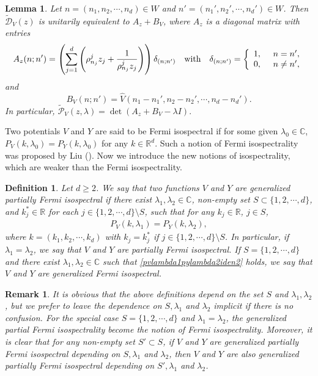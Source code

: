 \documentclass[12pt,letterpaper]{amsart}
\newtheorem{lemma}{Lemma}[section]
\newtheorem{remark}{Remark}[section]
\newtheorem{definition}{Definition}[section]
\def\R{{\mathbb R}}
\def\C{{\mathbb C}}
\begin{document}
\begin{lemma} \label{lemunitary}Let $n=(n_1,n_2,\cdots,n_d)\in W$ and $n'=(n_1',n_2',\cdots,n_d')\in W$. Then $\tilde{\mathcal{D}}_V(z)$ is unitarily equivalent to $A_z+B_V$, where $A_z$ is a diagonal matrix with entries
\[A_z(n;n')=\left(\sum_{j=1}^d\left(\rho^j_{n_j}z_j+\frac{1}{\rho^j_{n_j}z_j}\right)\right)\delta_{(n;n')}\quad {\rm with}\quad \delta_{(n;n')}=\left\{\begin{array}{l}
	1, \quad\  n=n',\\
	0,~\quad n\neq n',
\end{array}\right.\]
and
\[B_V(n;n')=\hat{V}(n_1-n_1',n_2-n_2',\cdots,n_d-n_d').\]
In particular, $\tilde{\mathcal{P}}_V(z,\lambda)=\det(A_z+B_V-\lambda I).$
\end{lemma}
{Two potentials $V$ and $Y$ are said to be Fermi isospectral if for some given $\lambda_0\in\C$, $P_V(k,\lambda_0)=P_Y(k,\lambda_0)$ for any $k\in\R^d$. Such a notion of Fermi isospectrality was proposed by Liu (\cite[Remark 2.6]{liucpam}). {Now we introduce the new notions of isospectrality, which are weaker than the Fermi isospectrality.}
\begin{definition}\label{defferisotrans}
Let $d\geq 2$. We say that two functions $V$ and $Y$ are generalized partially Fermi isospectral if there exist $\lambda_1,\lambda_2\in\C$, non-empty set $S\subset\{1,2,\cdots,d\}$, and $k_j^*\in\R$ for each $j\in \{1,2,\cdots,d\}\setminus S$, such that for any $k_j\in \R$, $j\in S$,
\begin{align}
P_V(k,\lambda_1)=P_Y(k,\lambda_2),\label{pvlambda1pylambda2iden2}
\end{align}
where $k=(k_1,k_2,\cdots,k_d)$ with $k_j=k_j^*$ if $j\in \{1,2,\cdots,d\}\setminus S$. In particular, if $\lambda_1=\lambda_2$, we say that $V$ and $Y$ are partially Fermi isospectral. If $S=\{1,2,\cdots,d\}$ and {there exist $\lambda_1,\lambda_2\in\C$ such that \eqref{pvlambda1pylambda2iden2} holds}, we say that $V$ and $Y$ are generalized Fermi isospectral.
\end{definition}
\begin{remark}
	It is obvious that the above definitions depend on the set $S$ and $\lambda_1,\lambda_2$, but we prefer to leave the dependence on $S,\lambda_1$ and $\lambda_2$ implicit if there is no confusion. For the special case $S=\{1,2,\cdots,d\}$ and $\lambda_1=\lambda_2$, the generalized partial Fermi isospectrality become the notion of Fermi isospectrality. Moreover, it is clear that for any non-empty set $S'\subset S$, if $V$ and $Y$ are {generalized} partially Fermi isospectral depending on $S,\lambda_1$ and $\lambda_2$, then $V$ and $Y$ are also {generalized} partially Fermi isospectral depending on $S',\lambda_1$ and $\lambda_2$.
\end{remark}
}
\end{document}
